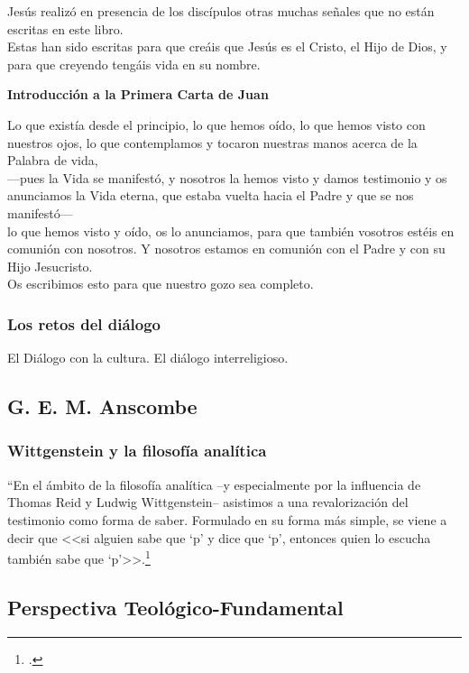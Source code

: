 \documentclass[12pt]{article}
\begin{document}
\noindent
\textrm{
 Jesús realizó en presencia de los discípulos otras muchas señales que no están escritas en este libro.\\
 Estas han sido escritas para que creáis que Jesús es el Cristo, el Hijo de Dios, y para que creyendo tengáis vida en su nombre.}


\noindent \textbf{Introducción a la Primera Carta de Juan}


\noindent
\textrm{
 Lo que existía desde el principio, lo que hemos oído, lo que hemos visto con nuestros ojos, lo que contemplamos y tocaron nuestras manos acerca de la Palabra de vida,\\
  ---pues la Vida se manifestó, y nosotros la hemos visto y damos testimonio y os anunciamos la Vida eterna, que estaba vuelta hacia el Padre y que se nos manifestó---\\
 lo que hemos visto y oído, os lo anunciamos, para que también vosotros estéis en comunión con nosotros. Y nosotros estamos en comunión con el Padre y con su Hijo Jesucristo.\\
 Os escribimos esto para que nuestro gozo sea completo.\\}


\subsubsection{Los retos del diálogo}
El Diálogo con la cultura. El diálogo interreligioso. 


\subsection{G. E. M. Anscombe}

\subsubsection{Wittgenstein y la filosofía analítica}
``En el ámbito de la filosofía analítica --y especialmente por la influencia de Thomas Reid y Ludwig Wittgenstein-- asistimos a una revalorización del testimonio como forma de saber. Formulado en su forma más simple, se viene a decir que <<si alguien sabe que `p' y dice que `p', entonces quien lo escucha también sabe que `p'>>.\footcite[p.~487]{feylogicaconesa}

\subsection{Perspectiva Teológico-Fundamental}
\end{document}

